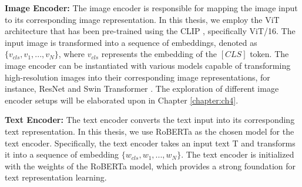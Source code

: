 
{\bf Image Encoder:} 
The image encoder is responsible for mapping the image input to its corresponding image representation. In this thesis, we employ the ViT architecture \cite{dosovitskiy2020vit} that has been pre-trained using the CLIP \cite{radford2021learning}, specifically ViT/16. The input image is transformed into a sequence of embeddings, denoted as $\{v_{cls},v_{1}, ...,v_{N}\}$, where $v_{cls}$ represents the embedding of the $[CLS]$ token. The image encoder can be instantiated with various models capable of transforming high-resolution images into their corresponding image representations, for instance, ResNet \cite{He_2016_CVPR} and Swin Transformer \cite{Liu_2021_ICCV}. The exploration of different image encoder setups will be elaborated upon in Chapter \ref{chapter:ch4}.

{\bf Text Encoder:} 
The text encoder converts the text input into its corresponding text representation. In this thesis, we use RoBERTa \cite{zhuang-etal-2021-robustly} as the chosen model for the text encoder. Specifically, the text encoder takes an input text T and transforms it into a sequence of embedding $\{w_{cls},w_{1}, ...,w_{N}\}$. The text encoder is initialized with the weights of the RoBERTa model, which provides a strong foundation for text representation learning. 

